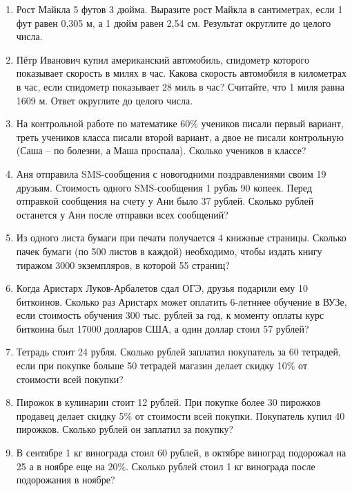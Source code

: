\begin{enumerate}
	\item Рост  Майкла  5  футов  3  дюйма.  Выразите  рост Майкла  в  сантиметрах,  если  1  фут 
	равен 0,305 м, а 1 дюйм равен 2,54 см. Результат округлите до целого числа. 
	
	\item  Пётр Иванович  купил  американский автомобиль,  спидометр  которого  показывает 
	скорость  в  милях  в  час.  Какова  скорость  автомобиля  в  километрах  в  час,  если 
	спидометр  показывает  28  миль  в  час?  Считайте,  что  1  миля  равна  1609  м.  Ответ 
	округлите до целого числа. 
	
	\item На контрольной работе по математике 60\% учеников писали первый вариант, треть 
	учеников  класса  писали  второй  вариант,  а  двое  не  писали  контрольную  (Саша  –  по 
	болезни, а Маша проспала). Сколько учеников в классе?
	
	\item Аня отправила SMS-сообщения с новогодними поздравлениями своим 19 друзьям. 
	Стоимость одного SMS-сообщения 1 рубль 90 копеек. Перед отправкой сообщения на 
	счету  у  Ани  было  37  рублей.  Сколько  рублей  останется  у  Ани  после  отправки  всех 
	сообщений?
	
	\item Из  одного  листа  бумаги  при  печати  получается  4  книжные  страницы. Сколько  
	пачек  бумаги  (по  500  листов  в  каждой)  необходимо,  чтобы  издать книгу тиражом 
	3000 экземпляров, в которой 55 страниц? 
	
	\item  Когда  Аристарх  Луков-Арбалетов  сдал  ОГЭ,  друзья  подарили  ему  10  биткоинов. 
	Сколько  раз  Аристарх  может  оплатить  6-летннее  обучение  в  ВУЗе,  если  стоимость 
	обучения 300 тыс. рублей за год, к моменту оплаты курс биткоина был 17000 долларов 
	США, а один доллар стоил 57 рублей?
	
	\item Тетрадь стоит 24 рубля. Сколько рублей заплатил покупатель за 60 тетрадей, если 
	при  покупке  больше  50  тетрадей  магазин  делает  скидку  10\%  от  стоимости  всей 
	покупки?
	 
	\item Пирожок в кулинарии стоит 12 рублей. При покупке более 30 пирожков продавец 
	делает скидку 5\% от стоимости всей покупки. Покупатель купил 40 пирожков. Сколько 
	рублей он заплатил за покупку? 
	
	\item В сентябре 1 кг винограда стоил 60 рублей, в октябре виноград подорожал на 25%
	а  в  ноябре  еще  на  20\%.  Сколько  рублей  стоил  1  кг  винограда  после  подорожания  в 
	ноябре?
	

\end{enumerate}
